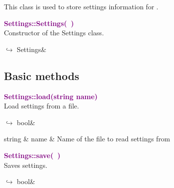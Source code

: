 This class is used to store settings information for \DynELA.



\textcolor{purple}{\textbf{Settings::Settings(~)}}\label{Settings::Settings()}\\
Constructor of the Settings class.\vspace*{-0.5em}
\begin{tcolorbox}[grow to left by=-1cm, width=\textwidth-1cm,myArgs,tabularx={l|R}]
$\hookrightarrow$ Settings&
\end{tcolorbox}


\subsection{Basic methods}

\textcolor{purple}{\textbf{Settings::load(string name)}}\label{Settings::load(string name)}\\
Load settings from a file.\vspace*{-0.5em}
\begin{tcolorbox}[grow to left by=-1cm, width=\textwidth-1cm,myArgs,tabularx={l|R}]
$\hookrightarrow$ bool&
\end{tcolorbox}

\begin{tcolorbox}[width=\textwidth,myArgs,tabularx={ll|R}]
string & name & Name of the file to read settings from
\end{tcolorbox}


\textcolor{purple}{\textbf{Settings::save(~)}}\label{Settings::save()}\\
Saves settings.\vspace*{-0.5em}
\begin{tcolorbox}[grow to left by=-1cm, width=\textwidth-1cm,myArgs,tabularx={l|R}]
$\hookrightarrow$ bool&
\end{tcolorbox}

